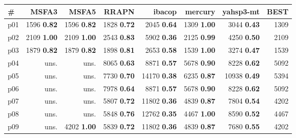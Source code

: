 \begin{tabular}{lrrrrrrr}
\toprule
\textbf{\#} & \textbf{MSFA3} & \textbf{MSFA5} & \textbf{RRAPN} & \textbf{ibacop} & \textbf{mercury} & \textbf{yahsp3-mt} & \textbf{BEST}\\
\midrule
\multicolumn{1}{l|}{p01} & {\footnotesize 1596} \textbf{0.82} & {\footnotesize 1596} \textbf{0.82} & {\footnotesize 1828} \textbf{0.72} & {\footnotesize 2045} \textbf{0.64} & {\footnotesize 1309} \textbf{1.00} & {\footnotesize 3044} \textbf{0.43} & \multicolumn{1}{|r}{1309}\\
\multicolumn{1}{l|}{p02} & {\footnotesize 2109} \textbf{1.00} & {\footnotesize 2109} \textbf{1.00} & {\footnotesize 2543} \textbf{0.83} & {\footnotesize 5902} \textbf{0.36} & {\footnotesize 2125} \textbf{0.99} & {\footnotesize 4250} \textbf{0.50} & \multicolumn{1}{|r}{2109}\\
\multicolumn{1}{l|}{p03} & {\footnotesize 1879} \textbf{0.82} & {\footnotesize 1879} \textbf{0.82} & {\footnotesize 1898} \textbf{0.81} & {\footnotesize 2653} \textbf{0.58} & {\footnotesize 1539} \textbf{1.00} & {\footnotesize 3274} \textbf{0.47} & \multicolumn{1}{|r}{1539}\\
\multicolumn{1}{l|}{p04} & uns. & uns. & {\footnotesize 8065} \textbf{0.63} & {\footnotesize 8871} \textbf{0.57} & {\footnotesize 5678} \textbf{0.90} & {\footnotesize 8228} \textbf{0.62} & \multicolumn{1}{|r}{5092}\\
\multicolumn{1}{l|}{p05} & uns. & uns. & {\footnotesize 7730} \textbf{0.70} & {\footnotesize 14170} \textbf{0.38} & {\footnotesize 6235} \textbf{0.87} & {\footnotesize 10938} \textbf{0.49} & \multicolumn{1}{|r}{5394}\\
\multicolumn{1}{l|}{p06} & uns. & uns. & {\footnotesize 7978} \textbf{0.64} & {\footnotesize 8871} \textbf{0.57} & {\footnotesize 5678} \textbf{0.90} & {\footnotesize 8228} \textbf{0.62} & \multicolumn{1}{|r}{5092}\\
\multicolumn{1}{l|}{p07} & uns. & uns. & {\footnotesize 5807} \textbf{0.72} & {\footnotesize 11802} \textbf{0.36} & {\footnotesize 4839} \textbf{0.87} & {\footnotesize 7804} \textbf{0.54} & \multicolumn{1}{|r}{4202}\\
\multicolumn{1}{l|}{p08} & uns. & uns. & {\footnotesize 5848} \textbf{0.76} & {\footnotesize 12762} \textbf{0.35} & {\footnotesize 4467} \textbf{1.00} & {\footnotesize 8590} \textbf{0.52} & \multicolumn{1}{|r}{4467}\\
\multicolumn{1}{l|}{p09} & uns. & {\footnotesize 4202} \textbf{1.00} & {\footnotesize 5839} \textbf{0.72} & {\footnotesize 11802} \textbf{0.36} & {\footnotesize 4839} \textbf{0.87} & {\footnotesize 7680} \textbf{0.55} & \multicolumn{1}{|r}{4202}\\

\end{tabular}
